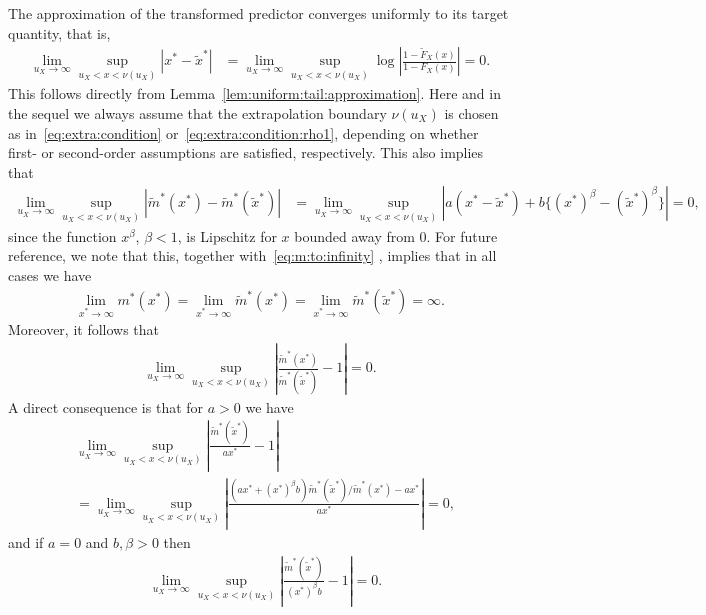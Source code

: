 \documentclass{statsoc}
\theoremstyle{break}
\begin{document}
The approximation of the transformed predictor converges uniformly to its target quantity, that is,
\begin{align}\label{xstar}
	\lim_{u_X \to \infty } \sup_{ u_X  <  x < \nu(u_X) } |x^* - \tilde x^*|  &= \lim_{u_X \to \infty} \sup_{  u_X < x < \nu(u_X) } \log \left|  \frac{1 - \tilde F_X(x)}{1-F_X(x)}\right| = 0.
\end{align}
This follows directly from Lemma~\ref{lem:uniform:tail:approximation}.
Here and in the sequel we always assume that the extrapolation boundary $\nu(u_X)$ is chosen as in~\eqref{eq:extra:condition} or~\eqref{eq:extra:condition:rho1}, depending on whether first- or second-order assumptions are satisfied, respectively.
 This also implies that 
\begin{align}\label{mstar}
	\lim_{u_X \to \infty } \sup_{ u_X  <  x < \nu(u_X) } |\tilde m^*(x^*) - \tilde m^*(\tilde x^*)|  &=  \lim_{u_X \to \infty } \sup_{ u_X  <  x < \nu(u_X) } | a(x^* - \tilde x^*) + b\{(x^*)^\beta - (\tilde x^*)^\beta\}| = 0,
\end{align}
since the function $x^\beta$, $\beta <1$, is Lipschitz for $x$ bounded away from 0. For future reference, we note that this, together with~\eqref{eq:m:to:infinity} , implies that in all cases we have
\begin{align}\label{m_infty}
	\lim_{x^* \to\infty} m^*(x^*) = \lim_{x^* \to\infty} \tilde m^*( x^*) = \lim_{x^* \to\infty} \tilde m^*( \tilde x^*) = \infty.
\end{align}
Moreover, it follows that 
\begin{align}\label{mstar_ratio}
	\lim_{u_X \to \infty } \sup_{ u_X  <  x < \nu(u_X) } \left|\frac{\tilde m^*(x^*)}{\tilde m^*(\tilde x^*)} - 1\right|  = 0.
\end{align}
A direct consequence is that for $a > 0$ we have
\begin{align}\label{mtilde}
	&\lim_{u_X \to \infty} \sup_{ u_X  <  x < \nu(u_X) }  \left|\frac{\tilde m^*(\tilde x^*)}{a x^*} - 1 \right| \nonumber \\
	& =  \lim_{u_X \to \infty} \sup_{ u_X  <  x < \nu(u_X) }   \left|\frac{(a x^* + (x^*)^\beta b) \tilde m^*(\tilde x^*)/ \tilde m^*( x^*)  - a x^*}{a x^*} \right| = 0,
\end{align}
and if $a = 0$ and $b,\beta > 0$ then
\begin{align}\label{mtilde:2}
	&\lim_{u_X \to \infty} \sup_{ u_X  <  x < \nu(u_X) }  \left|\frac{\tilde m^*(\tilde x^*)}{(x^*)^\beta b  } - 1 \right| = 0.
\end{align}
\end{document}
